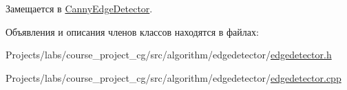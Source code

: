Замещается в \hyperlink{class_canny_edge_detector_ae97e095e14e43d763a8fc2563f6e9a87}{Canny\+Edge\+Detector}.



Объявления и описания членов классов находятся в файлах\+:\begin{DoxyCompactItemize}
\item 
Projects/labs/course\+\_\+project\+\_\+cg/src/algorithm/edgedetector/\hyperlink{edgedetector_8h}{edgedetector.\+h}\item 
Projects/labs/course\+\_\+project\+\_\+cg/src/algorithm/edgedetector/\hyperlink{edgedetector_8cpp}{edgedetector.\+cpp}\end{DoxyCompactItemize}
